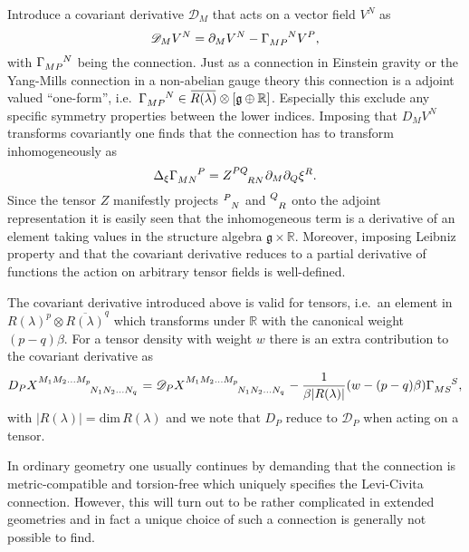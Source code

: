 Introduce a covariant derivative $\mathscr{D}_M$ that acts on a vector field $V^N$ as  
\begin{equation}
    \mathscr{D}_MV^N = \pd_M V^N-\tensor{\Gamma}{_{MP}^N}V^P,
\end{equation}
with $\tensor{\Gamma}{_{MP}^N}$ being the connection. Just as a connection in Einstein gravity or the Yang-Mills connection in a non-abelian gauge theory this connection is a adjoint valued ``one-form'', i.e.\ $\tensor{\Gamma}{_{MP}^N}\in \overbar{R(\lambda)}\otimes\left[\mathfrak{g}\oplus\mathbb{R}\right]$. Especially this exclude any specific symmetry properties between the lower indices. Imposing that $D_MV^N$ transforms covariantly one finds that the connection has to transform inhomogeneously as 
\begin{equation}\label{eq:InHomoConnection}
    \Delta_\xi \tensor{\Gamma}{_{MN}^P} = \tensor{Z}{^{PQ}_{RN}}\pd_M\pd_Q\xi^R. 
\end{equation}
Since the tensor $Z$ manifestly projects $\tensor{}{^P_N}$ and $\tensor{}{^Q_R}$ onto the adjoint representation it is easily seen that the inhomogeneous term is a derivative of an element taking values in the structure algebra $\mathfrak{g}\times\mathbb{R}$. Moreover, imposing Leibniz property and that the covariant derivative reduces to a partial derivative of functions the action on arbitrary tensor fields is well-defined. 

The covariant derivative introduced above is valid for tensors, i.e.\ an element in $R(\lambda)^p\otimes \overbar{R(\lambda)}^q$ which transforms under $\mathbb{R}$ with the canonical weight $(p-q)\beta$. For a tensor density with weight $w$ there is an extra contribution to the covariant derivative as 
\begin{equation}
    D_P \tensor{X}{^{M_1M_2\ldots M_p}_{N_1N_2\ldots N_q}} = \mathscr{D}_P\tensor{X}{^{M_1M_2\ldots M_p}_{N_1N_2\ldots N_q}}-\frac{1}{\beta |R(\lambda)|}(w-(p-q)\beta)\tensor{\Gamma}{_{MS}^S},
\end{equation}
with $|R(\lambda)|=\text{dim}\,R(\lambda)$ and we note that $D_P$ reduce to $\mathscr{D}_P$ when acting on a tensor.


In ordinary geometry one usually continues by demanding that the connection is metric-compatible and torsion-free which uniquely specifies the Levi-Civita connection. However, this will turn out to be rather complicated in extended geometries and in fact a unique choice of such a connection is generally not possible to find. 


